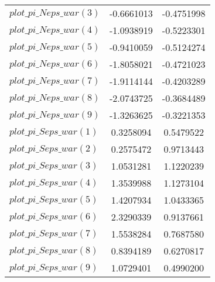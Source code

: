 \begin{center}
\begin{longtable}{lcc}
$plot\_pi\_N eps\_war (3)   $	 & 	     -0.6661013	 & 	     -0.4751998 \\ 
$plot\_pi\_N eps\_war (4)   $	 & 	     -1.0938919	 & 	     -0.5223301 \\ 
$plot\_pi\_N eps\_war (5)   $	 & 	     -0.9410059	 & 	     -0.5124274 \\ 
$plot\_pi\_N eps\_war (6)   $	 & 	     -1.8058021	 & 	     -0.4721023 \\ 
$plot\_pi\_N eps\_war (7)   $	 & 	     -1.9114144	 & 	     -0.4203289 \\ 
$plot\_pi\_N eps\_war (8)   $	 & 	     -2.0743725	 & 	     -0.3684489 \\ 
$plot\_pi\_N eps\_war (9)   $	 & 	     -1.3263625	 & 	     -0.3221353 \\ 
$plot\_pi\_S eps\_war (1)   $	 & 	      0.3258094	 & 	      0.5479522 \\ 
$plot\_pi\_S eps\_war (2)   $	 & 	      0.2575472	 & 	      0.9713443 \\ 
$plot\_pi\_S eps\_war (3)   $	 & 	      1.0531281	 & 	      1.1220239 \\ 
$plot\_pi\_S eps\_war (4)   $	 & 	      1.3539988	 & 	      1.1273104 \\ 
$plot\_pi\_S eps\_war (5)   $	 & 	      1.4207934	 & 	      1.0433365 \\ 
$plot\_pi\_S eps\_war (6)   $	 & 	      2.3290339	 & 	      0.9137661 \\ 
$plot\_pi\_S eps\_war (7)   $	 & 	      1.5538284	 & 	      0.7687580 \\ 
$plot\_pi\_S eps\_war (8)   $	 & 	      0.8394189	 & 	      0.6270817 \\ 
$plot\_pi\_S eps\_war (9)   $	 & 	      1.0729401	 & 	      0.4990200 \\ 
\end{longtable}
 \end{center}
